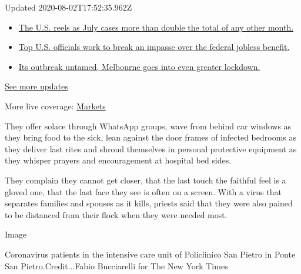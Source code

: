 Updated 2020-08-02T17:52:35.962Z

\begin{itemize}
\tightlist
\item
  \href{https://www.nytimes3xbfgragh.onion/2020/08/01/world/coronavirus-covid-19.html?action=click\&pgtype=Article\&state=default\&region=MAIN_CONTENT_1\&context=storylines_live_updates\#link-34047410}{The
  U.S. reels as July cases more than double the total of any other
  month.}
\item
  \href{https://www.nytimes3xbfgragh.onion/2020/08/01/world/coronavirus-covid-19.html?action=click\&pgtype=Article\&state=default\&region=MAIN_CONTENT_1\&context=storylines_live_updates\#link-780ec966}{Top
  U.S. officials work to break an impasse over the federal jobless
  benefit.}
\item
  \href{https://www.nytimes3xbfgragh.onion/2020/08/01/world/coronavirus-covid-19.html?action=click\&pgtype=Article\&state=default\&region=MAIN_CONTENT_1\&context=storylines_live_updates\#link-2bc8948}{Its
  outbreak untamed, Melbourne goes into even greater lockdown.}
\end{itemize}

\href{https://www.nytimes3xbfgragh.onion/2020/08/01/world/coronavirus-covid-19.html?action=click\&pgtype=Article\&state=default\&region=MAIN_CONTENT_1\&context=storylines_live_updates}{See
more updates}

More live coverage:
\href{https://www.nytimes3xbfgragh.onion/live/2020/07/31/business/stock-market-today-coronavirus?action=click\&pgtype=Article\&state=default\&region=MAIN_CONTENT_1\&context=storylines_live_updates}{Markets}

They offer solace through WhatsApp groups, wave from behind car windows
as they bring food to the sick, lean against the door frames of infected
bedrooms as they deliver last rites and shroud themselves in personal
protective equipment as they whisper prayers and encouragement at
hospital bed sides.

They complain they cannot get closer, that the last touch the faithful
feel is a gloved one, that the last face they see is often on a screen.
With a virus that separates families and spouses as it kills, priests
said that they were also pained to be distanced from their flock when
they were needed most.

Image

Coronavirus patients in the intensive care unit of Policlinico San
Pietro in Ponte San Pietro.Credit...Fabio Bucciarelli for The New York
Times


